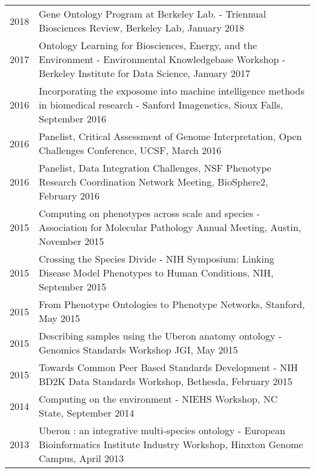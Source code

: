 \documentclass[11pt,fullpage]{article}
\begin{document}
\begin{longtable}{p{0.5in}|p{5.5in}}


 2018 & Gene Ontology Program at Berkeley Lab.
 - Triennual Biosciences Review,
 Berkeley Lab, January 2018 \\

 2017 & Ontology Learning for Biosciences, Energy, and the Environment
 - Environmental Knowledgebase Workshop - Berkeley Institute for Data
 Science, January 2017 \\
  
 2016 & Incorporating the exposome into machine intelligence methods
 in biomedical research - Sanford Imagenetics, Sioux Falls, September 2016\\ 
  
 2016 & Panelist, Critical Assessment of Genome Interpretation, Open Challenges Conference, UCSF, March 2016\\ 

 2016 & Panelist, Data Integration Challenges, NSF Phenotype Research Coordination Network Meeting, BioSphere2, February 2016\\ 
 
 2015 & Computing on phenotypes across scale and species - Association for Molecular Pathology Annual Meeting,
  Austin, November 2015\\ 

 2015 & Crossing the Species Divide - NIH Symposium: Linking Disease Model Phenotypes to Human Conditions, 
  NIH, September 2015\\

 2015 & From Phenotype Ontologies to Phenotype Networks, 
  Stanford, May 2015\\

 2015 & Describing samples using the Uberon anatomy ontology - Genomics Standards Workshop
  JGI, May 2015\\

 2015 & Towards Common Peer Based Standards Development  - NIH BD2K Data Standards Workshop, 
  Bethesda, February 2015\\

 2014 & Computing on the environment - NIEHS Workshop, 
 NC State, September 2014\\

 2013 & Uberon : an integrative multi-species ontology - European Bioinformatics Institute Industry Workshop, 
 Hinxton Genome Campus, April 2013\\


\end{longtable}
\end{document}
